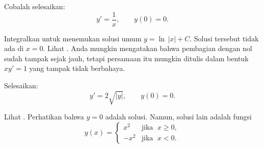\begin{example}
Cobalah selesaikan:
\begin{equation*}
y' = \frac{1}{x}, \qquad y(0) = 0 .
\end{equation*}

Integralkan untuk menemukan solusi umum $y = \ln \, \lvert x \rvert + C$.  Solusi tersebut
tidak ada di $x=0$.  Lihat .
Anda mungkin mengatakan bahwa pembagian dengan nol sudah tampak sejak jauh, tetapi
persamaan itu mungkin ditulis dalam bentuk $x y' = 1$ yang tampak tidak berbahaya.

\begin{myfig}
\parbox[t]{3in}{
 \capstart
 \caption{Medan kemiringan $y' = \nicefrac{1}{x}$.\label{1.3:xinvfig}}
}
\quad
\parbox[t]{3in}{
 \capstart
 \caption{Medan kemiringan $y' = 2 \sqrt{\lvert y \rvert}$ dengan dua
 solusi yang memenuhi $y(0) = 0$.\label{1.3:sqrtfig}}
}
\end{myfig}
\end{example}

\begin{example}
Selesaikan:
\begin{equation*}
y' = 2 \sqrt{\lvert y \rvert}, \qquad y(0) = 0 .
\end{equation*}

Lihat .
Perhatikan bahwa $y=0$ adalah solusi.  Namun, solusi lain adalah fungsi
\begin{equation*}
y(x) =
\begin{cases}
x^2 & \text{jika } \; x \geq 0,\\
-x^2 & \text{jika } \; x < 0.
\end{cases}
\end{equation*}
\end{example}

